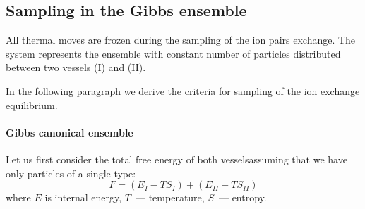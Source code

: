 \documentclass{elsarticle}
\begin{document}





\subsection{Sampling in the Gibbs ensemble\label{sec: sampling the gibbs ensemble}}
All thermal moves are frozen during the sampling of the ion pairs exchange.
The system represents the ensemble with constant number of particles distributed between two vessels (I) and (II).

In the following paragraph we derive the criteria for sampling of the ion exchange equilibrium.
\paragraph{Gibbs canonical ensemble}
Let us first consider the total free energy of both vesselsassuming that we have only particles of a single type:
\begin{equation}
    F=\left(E_{I}-TS_{I}\right) + \left(E_{II}-TS_{II}\right) \label{eq:F-gibbs}
\end{equation}
where $E$ is internal energy, $T$~--- temperature, $S$~--- entropy.
\end{document}
